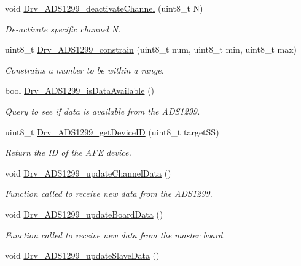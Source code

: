 \begin{DoxyCompactItemize}
void \hyperlink{group___a_d_s1299___library_gaf752ff51f24643ab51099720f9d69846}{Drv\+\_\+\+A\+D\+S1299\+\_\+deactivate\+Channel} (uint8\+\_\+t N)
\begin{DoxyCompactList}\small\item\em De-\/activate specific channel N. \end{DoxyCompactList}\item 
uint8\+\_\+t \hyperlink{group___a_d_s1299___library_ga713b706931292d92d4e8972d79a311a0}{Drv\+\_\+\+A\+D\+S1299\+\_\+constrain} (uint8\+\_\+t num, uint8\+\_\+t min, uint8\+\_\+t max)
\begin{DoxyCompactList}\small\item\em Constrains a number to be within a range. \end{DoxyCompactList}\item 
bool \hyperlink{group___a_d_s1299___library_ga55bafd8fc454bf91a40711e71c9028e0}{Drv\+\_\+\+A\+D\+S1299\+\_\+is\+Data\+Available} ()
\begin{DoxyCompactList}\small\item\em Query to see if data is available from the A\+D\+S1299. \end{DoxyCompactList}\item 
uint8\+\_\+t \hyperlink{group___a_d_s1299___library_ga812e36de1efba860dca4dec17b08b1a6}{Drv\+\_\+\+A\+D\+S1299\+\_\+get\+Device\+I\+D} (uint8\+\_\+t target\+S\+S)
\begin{DoxyCompactList}\small\item\em Return the I\+D of the A\+F\+E device. \end{DoxyCompactList}\item 
void \hyperlink{group___a_d_s1299___library_gab649fc7f231ca292b9c06cc31e50fff1}{Drv\+\_\+\+A\+D\+S1299\+\_\+update\+Channel\+Data} ()
\begin{DoxyCompactList}\small\item\em Function called to receive new data from the A\+D\+S1299. \end{DoxyCompactList}\item 
void \hyperlink{group___a_d_s1299___library_ga6a7fda986df83568223e0d81ec493169}{Drv\+\_\+\+A\+D\+S1299\+\_\+update\+Board\+Data} ()
\begin{DoxyCompactList}\small\item\em Function called to receive new data from the master board. \end{DoxyCompactList}\item 
void \hyperlink{group___a_d_s1299___library_gaf7e73c7a2a885b3ce8c63cc1af03851c}{Drv\+\_\+\+A\+D\+S1299\+\_\+update\+Slave\+Data} ()

\end{DoxyCompactItemize}
